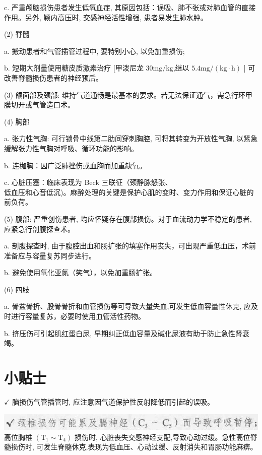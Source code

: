 \documentclass[10pt]{article}
\begin{document}
c. 严重颅脑损伤患者发生低氧血症, 其原因包括：误吸、肺不张或对肺血管的直接作用。另外, 颖内高压时, 交感神经活性增强, 患者易发生肺水肿。

(2) 脊髓

a. 搬动患者和气管插管过程中, 要特别小心, 以免加重损伤;

b. 短期大剂量使用糖皮质激素治疗 [甲泼尼龙 $30 \mathrm{mg} / \mathrm{kg}$,继以 $5.4 \mathrm{mg} /(\mathrm{kg} \cdot \mathrm{h})$ ] 可改善脊髓损伤患者的神经预后。

(3) 颌面部及颈部: 维持气道通畅是最基本的要求。若无法保证通气，需急行环甲膜切开或气管造口术。

(4) 胸部

a. 张力性气胸: 可行锁骨中线第二肋间穿刺胸腔, 可将其转变为开放性气胸, 以紧急缓解张力性气胸对呼吸、循环功能的影响。

b. 连枷胸：因广泛肺挫伤或血胸而加重缺氧。

c. 心脏压塞：临床表现为 Beck 三联征（颈静脉怒张、\\
低血压和心音低沉)。麻醉处理的关键是保护心肌的变时、变力作用和保证心脏的前负荷。

(5) 腹部: 严重创伤患者, 均应怀疑存在腹部损伤。对于血流动力学不稳定的患者, 应紧急行剖腹探查术。

a. 剖腹探查时, 由于腹腔出血和肠扩张的填塞作用丧失，可出现严重低血压，术前准备应与容量复苏同步进行。

b. 避免使用氧化亚氮（笑气），以免加重肠扩张。

(6) 四肢

a. 骨盆骨折、股骨骨折和血管损伤等可导致大量失血,可发生低血容量性休克, 应及时进行容量复苏，必要时使用血管活性药物。

b. 挤压伤可引起肌红蛋白尿, 早期纠正低血容量及碱化尿液有助于防止急性肾衰竭。

\section*{小贴士}
$\checkmark$ 脑损伤气管插管时, 应注意因气道保护性反射降低而引起的误吸。

\includegraphics[max width=\textwidth, center]{2024_07_05_645bb794a4d4f32ee0c8g-259}\\
高位胸椎 $\left(\mathrm{T}_{1} \sim \mathrm{T}_{4}\right)$ 损伤时, 心脏丧失交感神经支配,导致心动过缓。急性高位脊髓损伤时, 可发生脊髓休克,表现为低血压、心动过缓、反射消失和胃肠功能麻痹。
\end{document}
